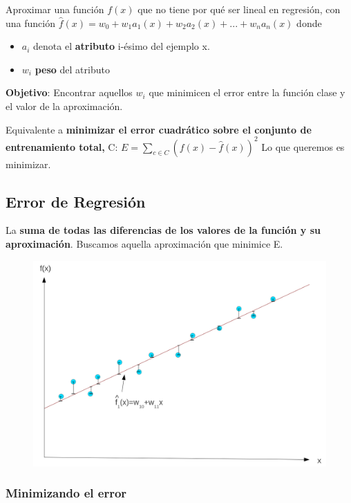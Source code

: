 \documentclass[12pt, twoside, openright]{report} %
\begin{document}
Aproximar una función \(f(x)\) que no tiene por qué ser lineal en
regresión, con una función
\textbf{\(\hat{f}(x)= w_0 + w_1a_1(x)+ w_2a_2(x)+ ...+ w_na_n(x)\)}
donde

\begin{itemize}

\item
  \(a_i\) denota el \textbf{atributo} i-ésimo del ejemplo x.
\item
  \(w_i\) \textbf{peso} del atributo
\end{itemize}

\textbf{Objetivo}: Encontrar aquellos \(w_i\) que minimicen el error
entre la función clase y el valor de la aproximación.

Equivalente a \textbf{minimizar el error cuadrático sobre el conjunto de
entrenamiento total, } C: \(E= \sum _{c \in C} (f(x)-\hat{f}(x))^2\) Lo
que queremos es minimizar.

\subsection{Error de Regresión}

La \textbf{suma de todas las diferencias de los valores de la función y
su aproximación}. Buscamos aquella aproximación que minimice E.
\begin{figure}[H]
	{\includegraphics[scale=.10]{image-20210305212854142.png}}
\end{figure}

\subsubsection{Minimizando el error}
\end{document}
